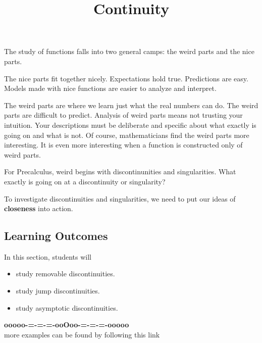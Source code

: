 \documentclass{ximera}
\title{Continuity}
\begin{document}
\begin{abstract}
\end{abstract}
\maketitle






The study of functions falls into two general camps: the weird parts and the nice parts.  

The nice parts fit together nicely. Expectations hold true. Predictions are easy. Models made with nice functions are easier to analyze and interpret.


The weird parts are where we learn just what the real numbers can do.  The weird parts are difficult to predict. Analysis of weird parts means not trusting your intuition.  Your descriptions must be deliberate and specific about what exactly is going on and what is not.  Of course, mathematicians find the weird parts more interesting.  It is even more interesting when a function is constructed only of weird parts.


For Precalculus, weird begins with discontinunities and singularities.  What exactly is going on at a discontinuity or singularity?


To investigate discontinuities and singularities, we need to put our ideas of \textbf{closeness} into action.




\subsection*{Learning Outcomes}


\begin{sectionOutcomes}
In this section, students will 

\begin{itemize}
\item study removable discontinuities.
\item study jump discontinuities.
\item study asymptotic discontinuities.

\end{itemize}
\end{sectionOutcomes}
















\begin{center}
\textbf{\textcolor{green!50!black}{ooooo-=-=-=-ooOoo-=-=-=-ooooo}} \\

more examples can be found by following this link\\ 

\end{center}
\end{document}
